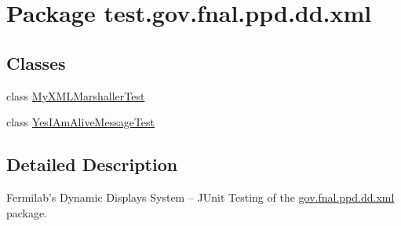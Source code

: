 \hypertarget{namespacetest_1_1gov_1_1fnal_1_1ppd_1_1dd_1_1xml}{\section{Package test.\-gov.\-fnal.\-ppd.\-dd.\-xml}
\label{namespacetest_1_1gov_1_1fnal_1_1ppd_1_1dd_1_1xml}
}
\subsection*{Classes}
\begin{DoxyCompactItemize}
\item 
class \hyperlink{classtest_1_1gov_1_1fnal_1_1ppd_1_1dd_1_1xml_1_1MyXMLMarshallerTest}{My\-X\-M\-L\-Marshaller\-Test}
\item 
class \hyperlink{classtest_1_1gov_1_1fnal_1_1ppd_1_1dd_1_1xml_1_1YesIAmAliveMessageTest}{Yes\-I\-Am\-Alive\-Message\-Test}
\end{DoxyCompactItemize}


\subsection{Detailed Description}
Fermilab's Dynamic Displays System -- J\-Unit Testing of the \hyperlink{namespacetest_1_1gov_1_1fnal_1_1ppd_1_1dd_1_1xml}{gov.\-fnal.\-ppd.\-dd.\-xml} package.